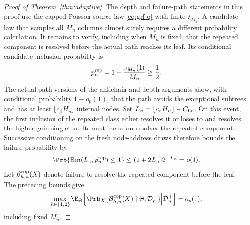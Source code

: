 \begin{appendix}
\begin{proof}[Proof of Theorem~\ref{thm:adaptive}]
The depth and failure-path statements in this proof use the capped-Poisson
source law \eqref{eq:grf-q} with finite \(\xi_{M_n}\). A candidate law that
samples all \(M_n\) columns almost surely requires a different probability
calculation.
It remains to verify, including when \(M_n\) is fixed, that the repeated
component is resolved before the actual path reaches its leaf. Its conditional
candidate-inclusion probability is
\[
p_n^{\rm rep}=1-\frac{\nu_{M_n}(1)}{M_n}\ge\frac12.
\]
The actual-path versions of the antichain and depth arguments show, with
conditional probability \(1-o_p(1)\), that the path avoids the exceptional
subtrees and has at least \(\lfloor c_\beta H_n\rfloor\) internal nodes. Set
\(L_n=\lfloor c_\beta H_n\rfloor-C_{\rm bd}\). On this event, the first
inclusion of the repeated class either resolves it or loses to and resolves the
higher-gain singleton. Its next inclusion resolves the repeated component.
Successive conditioning on the fresh node-address draws therefore bounds the
failure probability by
\[
\Prb\{\operatorname{Bin}(L_n,p_n^{\rm rep})\le1\}
\le(1+2L_n)2^{-L_n}=o(1).
\]
Let \(\mathcal B_{h,n}^{\rm cop}(X)\) denote failure to resolve the repeated
component before the leaf. The preceding bounds give
\begin{equation}\label{eq:app-copied-before-leaf}
\max_{h\in\{1,2\}}
\E_\Theta\!\left[
\Prb_X\{\mathcal B_{h,n}^{\rm cop}(X)\mid\Theta,\mathcal D_n^+\}
\middle|\mathcal D_n^+\right]=o_p(1),
\end{equation}
including fixed \(M_n\).


\end{proof}
\end{appendix}
